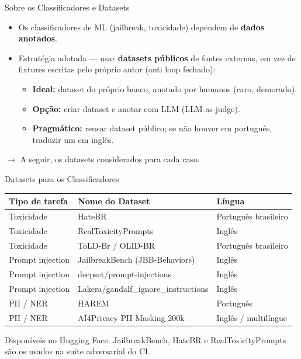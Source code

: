 \documentclass[aspectratio=169,11pt]{beamer}
\begin{document}
\begin{frame}{Sobre os Classificadores e Datasets}
  \begin{itemize}
    \item Os classificadores de ML (jailbreak, toxicidade) dependem de
    \textbf{dados anotados}.
    \item Estratégia adotada --- usar \textbf{datasets públicos} de fontes
    externas, em vez de fixtures escritas pelo próprio autor (anti loop fechado):
    \begin{itemize}\small
      \item \textbf{Ideal:} dataset do próprio banco, anotado por humanos
      (caro, demorado).
      \item \textbf{Opção:} criar dataset e anotar com LLM (LLM-as-judge).
      \item \textbf{Pragmático:} reusar dataset público; se não houver em
      português, traduzir um em inglês.
    \end{itemize}
  \end{itemize}
  \vspace{0.4em}
  $\rightarrow$ A seguir, os datasets considerados para cada caso.
\end{frame}

\begin{frame}{Datasets para os Classificadores}
  \small
  \begin{center}
  \begin{tabular}{@{}p{2.6cm}p{5.4cm}p{3.2cm}@{}}
    \toprule
    \textbf{Tipo de tarefa} & \textbf{Nome do Dataset} & \textbf{Língua}\\
    \midrule
    Toxicidade & HateBR & Português brasileiro\\
    Toxicidade & RealToxicityPrompts & Inglês\\
    Toxicidade & ToLD-Br / OLID-BR & Português brasileiro\\
    Prompt injection & JailbreakBench (JBB-Behaviors) & Inglês\\
    Prompt injection & deepset/prompt-injections & Inglês\\
    Prompt injection & Lakera/gandalf\_ignore\_instructions & Inglês\\
    PII / NER & HAREM & Português\\
    PII / NER & AI4Privacy PII Masking 200k & Inglês / multilíngue\\
    \bottomrule
  \end{tabular}
  \end{center}
  \vspace{0.3em}
  {\scriptsize Disponíveis no Hugging Face. JailbreakBench, HateBR e
  RealToxicityPrompts são os usados na suite adversarial do CI.}
\end{frame}
\end{document}
